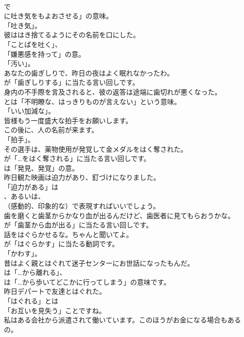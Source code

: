 \documentclass[8pt]{extreport}
\begin{document}
\begin{CJK}{UTF8}{min}
\\	で
\\	に吐き気をもよおさせる」の意味。
\\	「吐き気」。	
\\	彼ははき捨てるようにその名前を口にした。 
\\	「ことばを吐く」、
\\	「嫌悪感を持って」の意。
\\	「汚い」。	
\\	あなたの歯ぎしりで、昨日の夜はよく眠れなかったわ。 
\\	が「歯ぎしりする」に当たる言い回しです。	
\\	身内の不手際を言及されると、彼の返答は途端に歯切れが悪くなった。 
\\	とは「不明瞭な、はっきりものが言えない」という意味。
\\	「いい加減な」。	
\\	皆様もう一度盛大な拍手をお願いします。 
\\	この後に、人の名前が来ます。
\\	「拍手」。	
\\	その選手は、薬物使用が発覚して金メダルをはく奪された。 
\\	が「…をはく奪される」に当たる言い回しです。
\\	は「発見、発覚」の意。	
\\	昨日観た映画は迫力があり、釘づけになりました。 
\\	「迫力がある」は 
\\	、あるいは、
\\	（感動的、印象的な）で表現すればいいでしょう。	
\\	歯を磨くと歯茎からかなり血が出るんだけど、歯医者に見てもらおうかな。 
\\	が「歯茎から血が出る」に当たる言い回しです。	
\\	話をはぐらかせるな。ちゃんと聞いてよ。 
\\	が「はぐらかす」に当たる動詞です。
\\	「かわす」。	
\\	昔はよく親とはぐれて迷子センターにお世話になったもんだ。 
\\	は「…から離れる」、
\\	は「…から歩いてどこかに行ってしまう」の意味です。	
\\	昨日デパートで友達とはぐれた。 
\\	「はぐれる」とは
\\	「お互いを見失う」ことですね。	
\\	私はある会社から派遣されて働いています。このほうがお金になる場合もあるの。 

\end{CJK}
\end{document}
